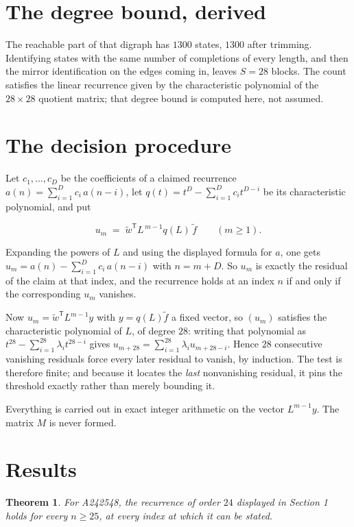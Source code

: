 \documentclass[11pt]{article}
\newtheorem{theorem}{Theorem}
\theoremstyle{definition}
\begin{document}
\section{The degree bound, derived}

The reachable part of that digraph has $1300$ states, $1300$ after trimming. Identifying states with the same number of completions of every length, and then the mirror identification on the edges coming in, leaves $S = 28$ blocks. The count satisfies the linear recurrence given by the characteristic polynomial of the $28\times28$ quotient matrix; that degree bound is computed here, not assumed.

\section{The decision procedure}

Let $c_1,\dots,c_D$ be the coefficients of a claimed recurrence $a(n) = \sum_{i=1}^{D} c_i\,a(n-i)$, let $q(t) = t^{D} - \sum_{i=1}^{D} c_i t^{D-i}$ be its characteristic polynomial, and put

\[u_m \;=\; \tilde w^{\mathsf T} L^{\,m-1} q(L)\,\tilde f \qquad (m \ge 1).\]

Expanding the powers of $L$ and using the displayed formula for $a$, one gets $u_m = a(n) - \sum_{i=1}^{D} c_i\,a(n-i)$ with $n = m + D$. So $u_m$ is exactly the residual of the claim at that index, and the recurrence holds at an index $n$ if and only if the corresponding $u_m$ vanishes.

Now $u_m = \tilde w^{\mathsf T} L^{m-1} y$ with $y = q(L)\tilde f$ a fixed vector, so $(u_m)$ satisfies the characteristic polynomial of $L$, of degree $28$: writing that polynomial as $t^{28} - \sum_{i=1}^{28} \lambda_i t^{28-i}$ gives $u_{m+28} = \sum_{i=1}^{28} \lambda_i u_{m+28-i}$. Hence $28$ consecutive vanishing residuals force every later residual to vanish, by induction. The test is therefore finite; and because it locates the {\itshape last} nonvanishing residual, it pins the threshold exactly rather than merely bounding it.

Everything is carried out in exact integer arithmetic on the vector $L^{m-1}y$. The matrix $M$ is never formed.

\section{Results}

\begin{theorem} For A242548, the recurrence of order $24$ displayed in Section 1 holds for every $n \ge 25$, at every index at which it can be stated.\end{theorem}
\end{document}
